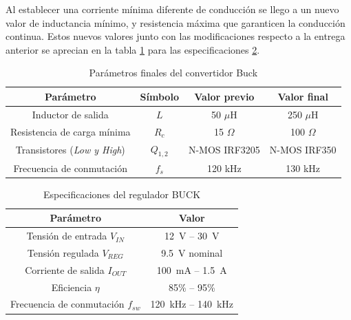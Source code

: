 \documentclass[]{article}
\begin{document}
	Al establecer una corriente mínima diferente de conducción se llego a un nuevo valor de inductancia mínimo, y resistencia máxima que garanticen la conducción continua. Estos nuevos valores junto con las modificaciones respecto a la entrega anterior se aprecian en la tabla \ref{tab:buck_parametros} para las especificaciones \ref{tab:spec_buck}.
	
	
	
	\begin{table}[H]
		\centering
		\caption{Parámetros finales del convertidor Buck}
		\label{tab:buck_parametros}
		\begin{tabular}{|c|c|c|c|}
			\hline
			\textbf{Parámetro} &
			\textbf{Símbolo} &
			\textbf{Valor previo} &
			\textbf{Valor final}
			\\ \hline
			
			Inductor de salida &
			$L$ &
			50 $\mu$H &
			250 $\mu$H
			\\ \hline
			
			
			Resistencia de carga mínima &
			$R_c$ &
			15 $\Omega$ &
			100 $\Omega$
			\\ \hline
			
			Transistores (\textit{Low y High})  &
			$Q_{1,2}$ &
			N-MOS IRF3205 &N-MOS IRF350
			
			\\ \hline
			
			Frecuencia de conmutación &
			$f_s$ &
			120 kHz &
			130 kHz
			\\ \hline
			
	
			
		\end{tabular}
	\end{table}
	
	
	\renewcommand{\arraystretch}{1.3}
	\begin{table}[H]
		\centering
		\caption{Especificaciones del regulador BUCK}
		\label{tab:spec_buck}
		\begin{tabular}{|c|c|}
			\hline
			Parámetro & Valor \\  \hline \hline
			Tensión de entrada $V_{IN}$ & \SI{12}{V} -- \SI{30}{V} \\ \hline
			Tensión regulada $V_{REG}$ & \SI{9.5}{V} nominal \\ \hline
			Corriente de salida $I_{OUT}$ & \SI{100}{mA} -- \SI{1.5}{A} \\ \hline
			Eficiencia $\eta$ & 85\% -- 95\% \\ \hline
			Frecuencia de conmutación $f_{sw}$ & \SI{120}{kHz} -- \SI{140}{kHz} \\ \hline
		\end{tabular}
	\end{table}
	
\end{document}
